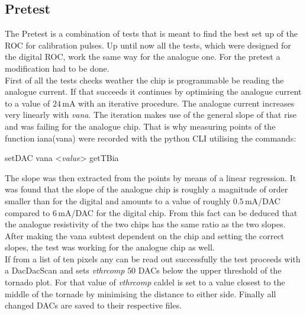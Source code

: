 \documentclass[british,11pt,a4paper]{memoir}
\begin{document}
\subsection{Pretest}
The Pretest is a combination of tests that is meant to find the best set up of the \ac{ROC} for calibration pulses. Up until now all the tests, which were designed for the digital \ac{ROC}, work the same way for the analogue one. For the pretest a modification had to be done.\\
First of all the tests checks weather the chip is programmable be reading the analogue current. If that succeeds it continues by optimising the analogue current to a value of $24\,$mA with an iterative procedure. The analogue current increases very linearly with \textit{vana}. The iteration makes use of the general slope of that rise and was failing for the analogue chip. That is why measuring points of the function iana(vana) were recorded with the python \ac{CLI} utilising the commands:
\begin{itemize}\ubuntu
	\tri setDAC vana <\textit{value}>
	\tri getTBia
\end{itemize}
The slope was then extracted from the points by means of a linear regression. It was found that the slope of the analogue chip is roughly a magnitude of order smaller than for the digital and amounts to a value of roughly $0.5\,$mA/DAC compared to $6\,$mA/DAC for the digital chip. From this fact can be deduced that the analogue resistivity of the two chips has the same ratio as the two slopes. After making the vana subtest dependent on the chip and setting the correct slopes, the test was working for the analogue chip as well.\\
If from a list of ten pixels any can be read out successfully the test proceeds with a DacDacScan and sets \textit{vthrcomp} $50$ \ac{DAC}s below the upper threshold of the tornado plot. For that value of \textit{vthrcomp} caldel is set to a value closest to the middle of the tornade by minimising the distance to either side. Finally all changed \ac{DAC}s are saved to their respective files. 
\end{document}
